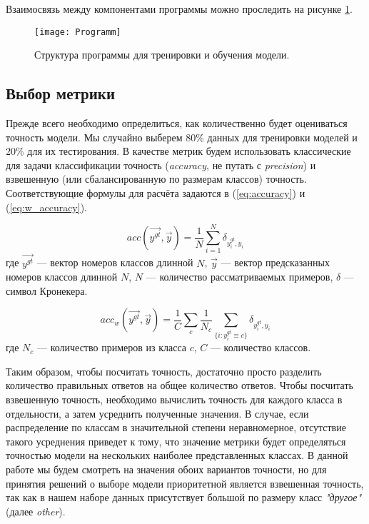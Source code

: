 \indent
\indent
Взаимосвязь между компонентами программы можно проследить на 
рисунке \ref{tikzpicture: programm}.

\begin{figure}[h!]
    \begin{center}
   	    \texttt{[image: Programm]}
   	\end{center}
   	\caption{Структура программы для тренировки и обучения модели.}
   	\label{tikzpicture: programm}
\end{figure}


\subsection{Выбор метрики}

\indent
\indent
Прежде всего необходимо определиться, как количественно будет оцениваться
точность модели. Мы случайно выберем 80\% данных 
для тренировки моделей и 
20\% для их тестирования. В качестве метрик будем использовать 
классические для задачи классификации точность
 (\textit{accuracy}, не путать с \textit{precision}) и взвешенную (или
 сбалансированную по размерам классов) точность. Соответствующие 
формулы для расчёта задаются в (\ref{eq:accuracy}) и (\ref{eq:w_accuracy}).


\begin{equation}\label{eq:accuracy}
	   acc(\vec{y^{gt}}, \vec{y}) = \frac{1}{N}\sum_{i=1}^{N} \delta_{y_i^{gt}, y_i}
\end{equation}
где $\vec{y^{gt}}$ --- вектор номеров классов длинной $N$, 
$\vec{y}$ --- вектор предсказанных номеров классов длинной $N$,
$N$ --- количество рассматриваемых примеров,
$\delta$ --- символ Кронекера.

\begin{equation}\label{eq:w_accuracy}
	   acc_w(\vec{y^{gt}}, \vec{y}) = 
	   \frac{1}{C} \sum_{c}
	   \frac{1}{N_c}\sum_{\{i: y_i^{gt}\equiv c\}} \delta_{y_i^{gt}, y_i}
\end{equation}
где $N_c$ --- количество примеров из класса $c$, $C$ --- количество классов.
 

\indent
\indent
Таким образом, чтобы посчитать точность, достаточно просто разделить
количество правильных ответов на общее количество ответов. Чтобы посчитать
взвешенную точность, необходимо вычислить точность для каждого класса
в отдельности, а затем усреднить полученные значения. В случае, если распределение
по классам в значительной степени неравномерное, отсутствие такого усреднения
приведет к тому, что значение метрики будет определяться точностью модели на
нескольких наиболее представленных классах. В данной работе мы будем
смотреть на значения обоих вариантов точности, но для принятия
решений о выборе модели приоритетной является взвешенная точность, так как в нашем наборе данных присутствует большой по размеру класс \textit{"другое"} (далее \textit{other}).


